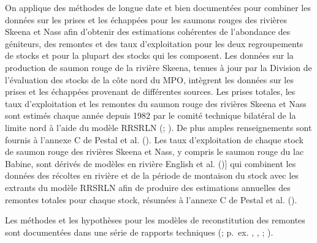 \documentclass[french,11pt]{book}
\begin{document}
On applique des méthodes de longue date et bien documentées pour combiner les données sur les prises et les échappées pour les saumons rouges des rivières Skeena et Nass afin d'obtenir des estimations cohérentes de l'abondance des géniteurs, des remontes et des taux d'exploitation pour les deux regroupements de stocks et pour la plupart des stocks qui les composent. Les données sur la production de saumon rouge de la rivière Skeena, tenues à jour par la Division de l'évaluation des stocks de la côte nord du MPO, intègrent les données sur les prises et les échappées provenant de différentes sources. Les prises totales, les taux d'exploitation et les remontes du saumon rouge des rivières Skeena et Nass sont estimés chaque année depuis 1982 par le comité technique bilatéral de la limite nord à l'aide du modèle RRSRLN (; ). De plus amples renseignements sont fournis à l'annexe C de Pestal et al. (). Les taux d'exploitation de chaque stock de saumon rouge des rivières Skeena et Nass, y compris le saumon rouge du lac Babine, sont dérivés de modèles en rivière English et al. (){]} qui combinent les données des récoltes en rivière et de la période de montaison du stock avec les extrants du modèle RRSRLN afin de produire des estimations annuelles des remontes totales pour chaque stock, résumées à l'annexe C de Pestal et al. ().

Les méthodes et les hypothèses pour les modèles de reconstitution des remontes sont documentées dans une série de rapports techniques (; p.~ex. , , ; ).
\end{document}
